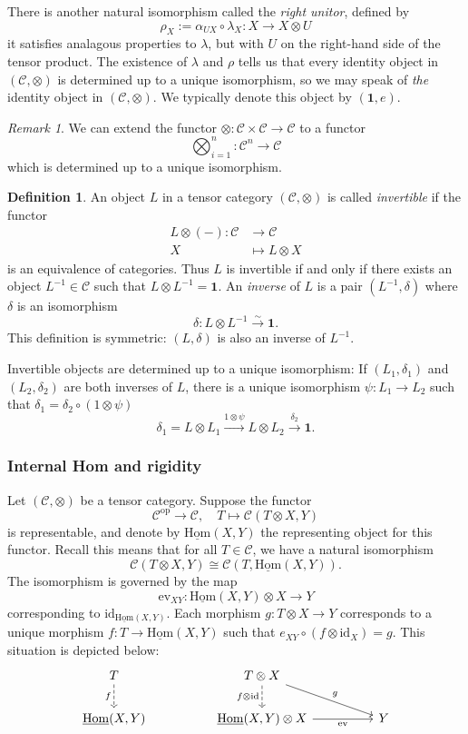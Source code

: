 \documentclass[10pt]{amsart}
\numberwithin{equation}{section}
\def\~#1{\mathscr{#1}}
\def\To#1{\xrightarrow{#1}}
\newcommand{\isom}{\xrightarrow{\sim}}
\newcommand{\id}{\mathrm{id}}
\newcommand{\op}{\mathrm{op}}
\newcommand{\ev}{\mathrm{ev}}
\newcommand{\Hom}{\mathrm{Hom}}
\theoremstyle{plain}
\theoremstyle{definition}
\newtheorem{defn}[thm]{Definition}
\theoremstyle{remark}
\newtheorem*{rmk}{Remark}
\begin{document}
There is another natural isomorphism called the \emph{right unitor}, defined by
\[\rho_X := \alpha_{UX} \circ \lambda_X: X \to X \otimes U\]
it satisfies analagous properties to $\lambda$, but with $U$ on the right-hand side of the tensor product. The existence of $\lambda$ and $\rho$ tells us that every identity object in $(\~C, \otimes)$ is determined up to a unique isomorphism, so we may speak of \emph{the} identity object in $(\~C, \otimes)$. We typically denote this object by $(\mathbf{1}, e)$.

\begin{rmk}
    We can extend the functor $\otimes: \~C \times \~C \to \~C$ to a functor
\[\bigotimes_{i = 1}^n: \~C^n \to \~C\]
which is determined up to a unique isomorphism.
\end{rmk}

\begin{defn}
An object $L$ in a tensor category $(\~C, \otimes)$ is called \emph{invertible} if the functor
\begin{align*}
    L \otimes (-): \~C &\to \~C \\ 
    X & \mapsto L \otimes X
\end{align*}
is an equivalence of categories. Thus $L$ is invertible if and only if there exists an object $L^{-1} \in \~C$ such that $L \otimes L^{-1} = \mathbf{1}$. An \emph{inverse} of $L$ is a pair $(L^{-1}, \delta)$ where $\delta$ is an isomorphism
\[\delta: L \otimes L^{-1} \isom \mathbf{1}.\]
This definition is symmetric: $(L, \delta)$ is also an inverse of $L^{-1}$.
\end{defn}
Invertible objects are determined up to a unique isomorphism: If $(L_1, \delta_1)$ and $(L_2, \delta_2)$ are both inverses of $L$, there is a unique isomorphism $\psi: L_1 \to L_2$ such that $\delta_1 = \delta_2 \circ (1 \otimes \psi)$ 
\[\delta_1 = L \otimes L_1 \To{1 \otimes \psi} L \otimes L_2 \To{\delta_2} \mathbf{1}.\]

\subsubsection{Internal Hom and rigidity}
Let $(\~C, \otimes)$ be a tensor category. Suppose the functor 
    \[
        \~C^\op \to \~C, \quad T \mapsto \~C(T \otimes X, Y)
    \]
is representable, and denote by $\underline{\Hom}(X, Y)$ the representing object for this functor. Recall this means that for all $T \in \~C$, we have a natural isomorphism
\[\~C(T \otimes X, Y) \cong \~C(T, \underline{\Hom}(X,Y)).\]
The isomorphism is governed by the map
\[\ev_{XY}: \underline{\Hom}(X, Y) \otimes X \to Y\]
corresponding to $\id_{\underline{\Hom}(X, Y)}$. Each morphism $g: T \otimes X \to Y$ corresponds to a unique morphism $f: T \to \underline{\Hom}(X, Y)$ such that $e_{XY} \circ (f \otimes \id_X) = g$. This situation is depicted below:
\[\begin{tikzcd}
    T && {T\otimes X} \\
    {\underline{\Hom}(X, Y)} && {\underline{\Hom}(X, Y) \otimes X} && Y
    \arrow["f"', dashed, from=1-1, to=2-1]
    \arrow["{f \otimes \id}"', dashed, from=1-3, to=2-3]
    \arrow["g", from=1-3, to=2-5]
    \arrow["\ev"', from=2-3, to=2-5]
\end{tikzcd}\]
\end{document}
